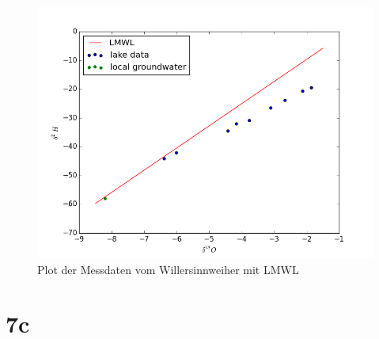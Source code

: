 \documentclass[10pt,a4paper]{article}
\begin{document}
\begin{figure}[ht]
\centering
\includegraphics[width=1\linewidth]{plot_data_LMWL.png}
\caption{Plot der Messdaten vom Willersinnweiher mit LMWL}
\label{fig:value_data}
\end{figure}

\clearpage
\section*{7c}
\end{document}
